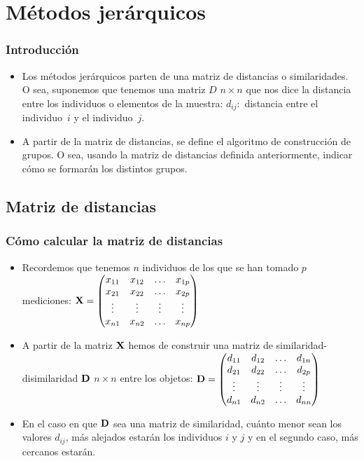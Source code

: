 \section{Métodos jerárquicos}

\begin{frame}
\frametitle{Introducción}
\begin{itemize}
\item<2->{Los métodos jerárquicos parten de una matriz de distancias o similaridades. O sea, suponemos que tenemos una matriz $D$ $n\times n$ que nos dice la distancia entre los individuos o elementos de la muestra: $d_{ij}:$ distancia entre el individuo~$i$ y el individuo~$j$. }
\item<3->{A partir de la matriz de distancias, se define el algoritmo de construcción de grupos. O sea, usando la matriz de distancias definida anteriormente, indicar cómo se formarán los distintos grupos.}
\end{itemize}
\end{frame}
\subsection{Matriz de distancias}
\begin{frame}
\frametitle{Cómo calcular la matriz de distancias}
\begin{itemize}
\item<2->{Recordemos que tenemos $n$ individuos de los que se han tomado $p$ mediciones:
$\mathbf{X}=
\begin{pmatrix}
x_{11}&x_{12}&\ldots&x_{1p} \\ 
x_{21}&x_{22}&\ldots&x_{2p} \\
\vdots&\vdots&\vdots&\vdots \\
x_{n1}&x_{n2}&\ldots&x_{np}
\end{pmatrix}$}
\item<3->{A partir de la matriz $\mathbf{X}$ hemos de construir una matriz de similaridad-disimilaridad $\mathbf{D}$ $n\times n$ entre los objetos:
$\mathbf{D}=
\begin{pmatrix}
d_{11}&d_{12}&\ldots&d_{1n} \\ 
d_{21}&d_{22}&\ldots&d_{2p} \\
\vdots&\vdots&\vdots&\vdots \\
d_{n1}&d_{n2}&\ldots&d_{nn}
\end{pmatrix}$}
\item<4->{En el  caso en que $\mathbf{D}$ sea una matriz de similaridad, cuánto menor sean los valores $d_{ij}$, más alejados estarán los individuos $i$ y $j$ y en el segundo caso, más cercanos estarán.}
\end{itemize}
\end{frame}
